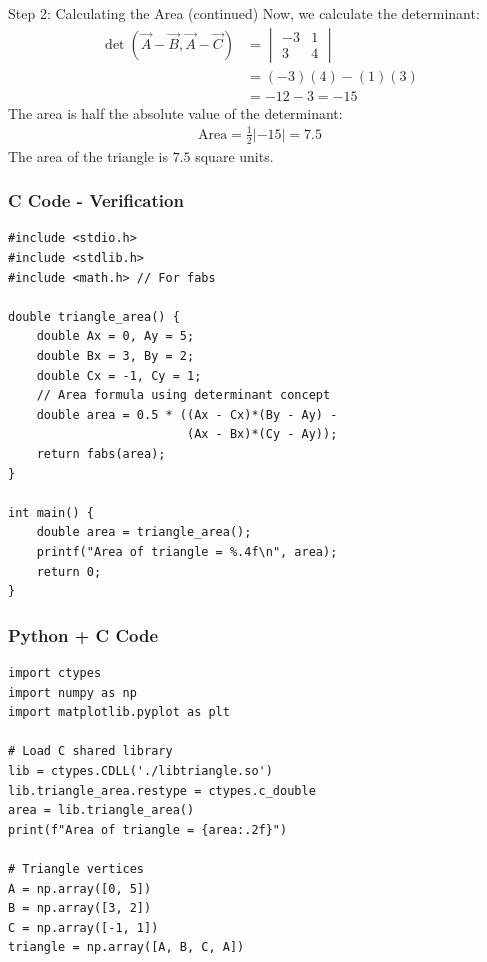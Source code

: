 \documentclass{beamer}
\begin{document}
\begin{frame}{Step 2: Calculating the Area (continued)}
Now, we calculate the determinant:
\begin{align}
    \det(\vec{A}-\vec{B}, \vec{A}-\vec{C}) &= \begin{vmatrix} -3 & 1 \\ 3 & 4 \end{vmatrix} \nonumber \\
    &= (-3)(4) - (1)(3) \nonumber \\
    &= -12 - 3 = -15 \label{eq:det_val}
\end{align}
The area is half the absolute value of the determinant:
\begin{align}
    \text{Area} = \frac{1}{2} |-15| = 7.5
\end{align}
The area of the triangle is $7.5$ square units.
\end{frame}

\begin{frame}[fragile]
    \frametitle{C Code - Verification}
    \lstset{language=C}
    \begin{lstlisting}
#include <stdio.h>
#include <stdlib.h>
#include <math.h> // For fabs

double triangle_area() {
    double Ax = 0, Ay = 5;
    double Bx = 3, By = 2;
    double Cx = -1, Cy = 1;
    // Area formula using determinant concept
    double area = 0.5 * ((Ax - Cx)*(By - Ay) - 
                         (Ax - Bx)*(Cy - Ay));
    return fabs(area);
}

int main() {
    double area = triangle_area();
    printf("Area of triangle = %.4f\n", area);
    return 0;
}
    \end{lstlisting}
\end{frame}

\begin{frame}[fragile]
    \frametitle{Python + C Code}
    \lstset{language=Python}
    \begin{lstlisting}
import ctypes
import numpy as np
import matplotlib.pyplot as plt

# Load C shared library
lib = ctypes.CDLL('./libtriangle.so')
lib.triangle_area.restype = ctypes.c_double
area = lib.triangle_area()
print(f"Area of triangle = {area:.2f}")

# Triangle vertices
A = np.array([0, 5])
B = np.array([3, 2])
C = np.array([-1, 1])
triangle = np.array([A, B, C, A])
    \end{lstlisting}
\end{frame}
\end{document}
